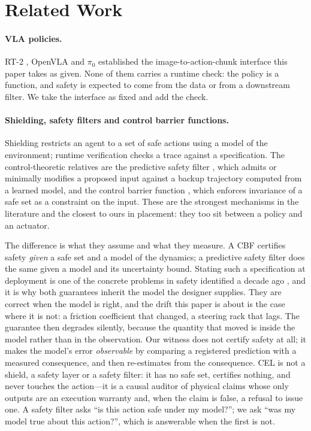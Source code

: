 \documentclass[conference]{IEEEtran}
\theoremstyle{definition}
\begin{document}
\section{Related Work}

\paragraph{VLA policies.} RT-2 \cite{brohan2023rt2}, OpenVLA
\cite{kim2024openvla} and $\pi_0$ \cite{black2024pi0} established the
image-to-action-chunk interface this paper takes as given. None of them carries
a runtime check: the policy is a function, and safety is expected to come from
the data or from a downstream filter. We take the interface as fixed and add
the check.

\paragraph{Shielding, safety filters and control barrier functions.} Shielding
\cite{alshiekh2018shielding} restricts an agent to a set of safe actions using a
model of the environment; runtime verification \cite{bartocci2018runtime,%
katz2017reluplex} checks a trace against a specification. The control-theoretic
relatives are the predictive safety filter \cite{wabersich2021safetyfilter},
which admits or minimally modifies a proposed input against a backup trajectory
computed from a learned model, and the control barrier function
\cite{ames2019cbf}, which enforces invariance of a safe set as a constraint on
the input. These are the strongest mechanisms in the literature and the closest
to ours in placement: they too sit between a policy and an actuator.

The difference is what they assume and what they measure. A CBF certifies
safety \emph{given} a safe set and a model of the dynamics; a predictive safety
filter does the same given a model and its uncertainty bound. Stating such a
specification at deployment is one of the concrete problems in safety identified
a decade ago \cite{amodei2016concrete}, and it is why both guarantees inherit
the model the designer supplies. They are correct when the model is right, and
the drift this paper is about is the case where it is not: a friction
coefficient that changed, a steering rack that lags. The guarantee then degrades
silently, because the quantity that moved is inside the model rather than in the
observation. Our witness does not certify safety at all; it makes the model's
error \emph{observable} by comparing a registered prediction with a measured
consequence, and then re-estimates from the consequence. CEL is not a shield, a
safety layer or a safety filter: it has no safe set, certifies nothing, and never
touches the action---it is a causal auditor of physical claims whose only outputs
are an execution warranty and, when the claim is false, a refusal to issue one. A
safety filter asks
``is this action safe under my model?''; we ask ``was my model true about this
action?'', which is answerable when the first is not.
\end{document}
